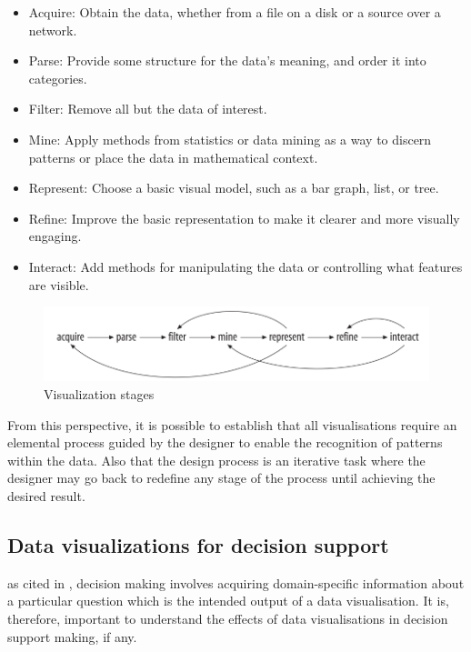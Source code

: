 \begin{displayquote}
	\begin{itemize}
\item Acquire: Obtain the data, whether from a file on a disk or a source over a network. 
\item Parse: Provide some structure for the data’s meaning, and order it into categories. 
\item Filter: Remove all but the data of interest. 
\item Mine: Apply methods from statistics or data mining as a way to discern patterns or place the data in mathematical context.
\item Represent: Choose a basic visual model, such as a bar graph, list, or tree. 
\item Refine: Improve the basic representation to make it clearer and more visually engaging. 
\item Interact: Add methods for manipulating the data or controlling what features are visible.
\end{itemize}
\end{displayquote}

\begin{figure}[!htb]
\begin{adjustbox}{width=1\textwidth,center=\textwidth}
  \centering
  \includegraphics[scale=1]{images/visualization_stages.png}
\end{adjustbox}
  \caption[Visualization stages]{Visualization stages  \cite{Cleveland1993} }
  \label{fig:data_visualization_stages}
\end{figure}
From this perspective, it is possible to establish that all visualisations require an elemental process guided by the designer to enable the recognition of patterns within the data. Also that the design process is an iterative task where the designer may go back to redefine any stage of the process until achieving the desired result. 

\subsection{Data visualizations for decision support}
 \cite{carroll1987mental} as cited in \cite{Zhu2008}, decision making involves acquiring domain-specific information about a particular question which is the intended output of a data visualisation. It is, therefore, important to understand the effects of data visualisations in decision support making, if any.


